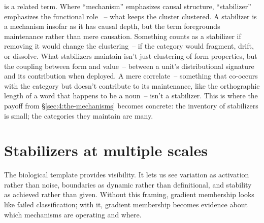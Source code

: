  is a related term. Where \enquote{mechanism} emphasizes causal structure, \enquote{stabilizer} emphasizes the functional role \parencite{illari2012}~-- what keeps the cluster clustered. A stabilizer is a mechanism insofar as it has causal depth, but the term foregrounds maintenance rather than mere causation. Something counts as a stabilizer if removing it would change the clustering~-- if the category would fragment, drift, or dissolve. What stabilizers maintain isn't just clustering of form properties, but the coupling between form and value~-- between a unit's distributional signature and its contribution when deployed. A mere correlate~-- something that co-occurs with the category but doesn't contribute to its maintenance, like the orthographic length of a word that happens to be a noun~-- isn't a stabilizer. This is where the  payoff from §\ref{sec:4:the-mechanisms} becomes concrete: the inventory of stabilizers is small; the categories they maintain are many.

\section{Stabilizers at multiple scales}
\label{sec:6:stabilizers-at-scales}

The biological template provides visibility. It lets us see variation as activation rather than noise, boundaries as dynamic rather than definitional, and stability as achieved rather than given. Without this framing, gradient membership looks like failed classification; with it, gradient membership becomes evidence about which mechanisms are operating and where.

